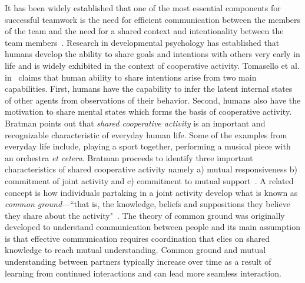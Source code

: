 \documentclass[12pt]{article}
\begin{document}
It has been widely established that one of the most essential components for successful teamwork is the need for efficient communication between the members of the team and the need for a shared context and intentionality between the team members~\cite{tomasello2007shared}. Research in developmental psychology has established that humans develop the ability to share goals and intentions with others very early in life and is widely exhibited in the context of cooperative activity. Tomasello et al. in~\cite{tomasello2007shared} claims that human ability to share intentions arise from two main capabilities. First, humans have the capability to infer the latent internal states of other agents from observations of their behavior. Second, humans also have the motivation to share mental states which forms the basis of cooperative activity. Bratman points out that \textit{shared cooperative activity} is an important and recognizable characteristic of everyday human life. Some of the examples from everyday life include, playing a sport together, performing a musical piece with an orchestra \textit{et cetera}. Bratman proceeds to identify three important characteristics of shared cooperative activity namely a) mutual responsiveness b) commitment of joint activity and c) commitment to mutual support~\cite{bratman1992shared}. A related concept is how individuals partaking in a joint activity develop what is known as \textit{common ground}---``that is, the knowledge, beliefs and suppositions they believe they share about the activity"~\cite{clark1996using}. The theory of common ground was originally developed to understand communication between people and its main assumption is that effective communication requires coordination that elies on shared knowledge to reach mutual understanding.  Common ground and mutual understanding between partners typically increase over time as a result of learning from continued interactions and can lead more seamless interaction.
\end{document}
